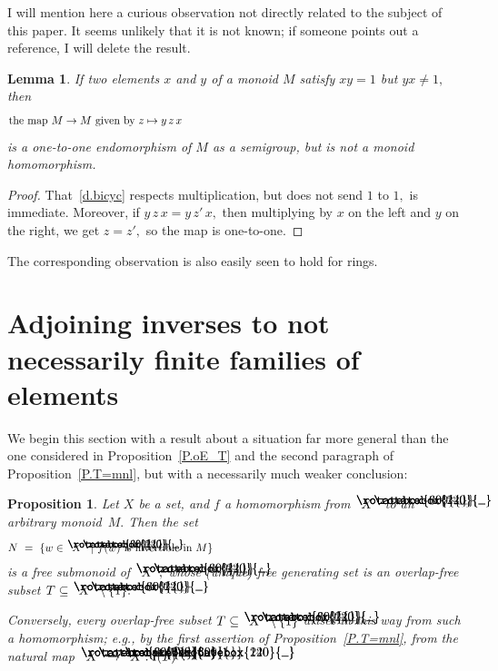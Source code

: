 \documentclass{amsart}
\newtheorem{lemma}[equation]{Lemma}
\newtheorem{proposition}[equation]{Proposition}
\numberwithin{equation}{section}
\newcommand{\I}{\mathbf{i}\hspace{.05em}}
\newcommand{\langl}{\begin{picture}(.51em,1em)
\put(.11em,.33em){\rotatebox{60}{\line(1,0){.55em}}}
\put(.11em,.33em){\rotatebox{300}{\line(1,0){.55em}}}
\end{picture}}
\newcommand{\rangl}{\begin{picture}(.5em,1em)
\put(.09em,.33em){\rotatebox{120}{\line(1,0){.55em}}}
\put(.09em,.33em){\rotatebox{240}{\line(1,0){.55em}}}
\end{picture}}
\begin{document}
I will mention here a curious observation not directly related to the
subject of this paper.
It seems unlikely that it is not known; if someone points
out a reference, I will delete the result.

\begin{lemma}\label{L.bicyc}
If two elements $x$ and $y$ of a monoid $M$ satisfy $xy=1$
but $yx\neq 1,$ then
%
\begin{equation}\begin{minipage}[c]{35pc}\label{d.bicyc}
the map $M\to M$ given by $z\mapsto y\,z\,x$
\end{minipage}\end{equation}
%
is a one-to-one endomorphism of $M$ as a semigroup, but is
not a monoid homomorphism.
\end{lemma}

\begin{proof}
That~\eqref{d.bicyc} respects multiplication, but does
not send $1$ to $1,$ is immediate.
Moreover, if $y\,z\,x=y\,z'\,x,$ then multiplying
by $x$ on the left and $y$ on the right, we get $z=z',$
so the map is one-to-one.
\end{proof}

The corresponding observation is also easily seen to hold for rings.

\section{Adjoining inverses to not necessarily finite families
of elements}\label{S.inf}

We begin this section with a result about a situation
far more general than the
one considered in Proposition~\ref{P.oE_T} and the second paragraph of
Proposition~\ref{P.T=mnl}, but with a necessarily
much weaker conclusion:

\begin{proposition}\label{P.gen_hm}
Let $X$ be a set, and $f$ a homomorphism from $\langl X\rangl$
to an arbitrary monoid~$M.$
Then the set
%
\begin{equation}\begin{minipage}[c]{35pc}\label{d.N}
$N\ =\ \{w\in \langl X\rangl~|~f(w)$ is invertible in $M\}$
\end{minipage}\end{equation}
%
is a {\em free} submonoid of $\langl X\rangl,$
whose {\rm(}unique{\rm)} free generating
set is an overlap-free subset $T\subseteq\langl X\rangl\setminus\{1\}.$

Conversely, every overlap-free subset
$T\subseteq\langl X\rangl\setminus\{1\}$
arises in this way from such a homomorphism; e.g.,
by the first assertion of Proposition~\ref{P.T=mnl}, from
the natural map $\langl X\rangl\to\langl X : \I(T)\rangl.$
\end{proposition}
\end{document}
